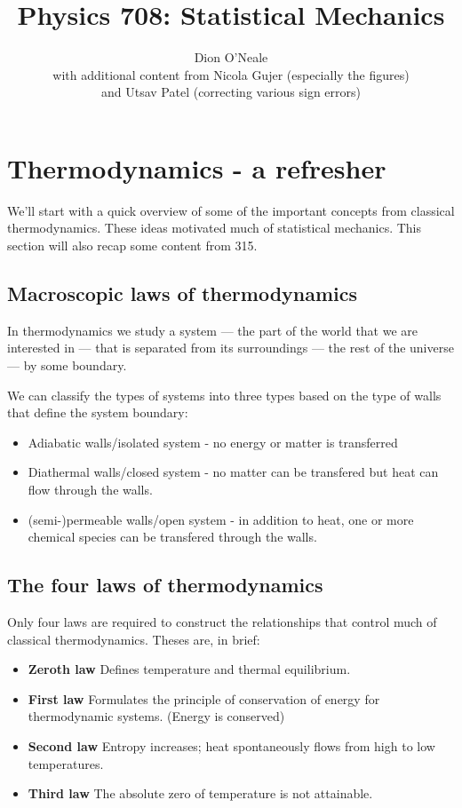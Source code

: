 \documentclass{article}
\title{Physics 708: Statistical Mechanics}
\author{Dion O'Neale\\
	with additional content from Nicola Gujer (especially the figures)\\
	and Utsav Patel (correcting various sign errors)}
\begin{document}
\maketitle
\tableofcontents

\pagebreak

\section{Thermodynamics - a refresher}
We'll start with a quick overview of some of the important concepts from classical thermodynamics. These ideas motivated much of statistical mechanics. This section will also recap some content from 315.

\subsection{Macroscopic laws of thermodynamics}
In thermodynamics we study a system --- the part of the world that we are interested in --- that is separated from its surroundings --- the rest of the universe --- by some boundary.

We can classify the types of systems into three types based on the type of walls that define the system boundary:
\begin{itemize}
\item Adiabatic walls/isolated system - no energy or matter is transferred
\item Diathermal walls/closed system - no matter can be transfered but heat can flow through the walls.
\item (semi-)permeable walls/open system - in addition to heat, one or more chemical species can be transfered through the walls. 
\end{itemize}

\subsection{The four laws of thermodynamics}
Only four laws are required to construct the relationships that control much of classical thermodynamics. Theses are, in brief:
\begin{itemize}
\item {\bf Zeroth law} Defines temperature and thermal equilibrium.
\item {\bf First law} Formulates the principle of conservation of energy for thermodynamic systems. (Energy is conserved)
\item {\bf Second law} Entropy increases; heat spontaneously flows from high to low temperatures.
\item {\bf Third law} The absolute zero of temperature is not attainable.  
\end{itemize}
\end{document}
